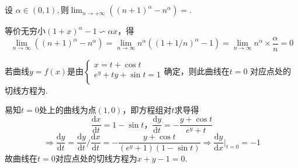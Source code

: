 \documentclass[hideanswer=false,
	enfont=newtxtext,
	zhfont=empty,
	mathfont=newtxmath,
]{cmcthesis}
\begin{document}

\addvspace{1\bigskipamount}

\\\\
\wq 设 $\alpha\in\left(0,1\right),\textrm{则} \lim_{n\rightarrow +\infty}\left(\left(n+1\right)^{\alpha}-n^{\alpha}\right)=$\underline{\hspace{3em}}.\\
	\begin{answer}
	\begin{solution}
等价无穷小$\left(1+x\right)^{\alpha}-1\backsim\alpha x$，得
		\[
		\lim_{n\rightarrow\infty}\left(\left(n+1\right)^{\alpha}-n^{\alpha}\right)=\lim_{n\rightarrow\infty}n^{\alpha}\left(\left(1+1/n\right)^{\alpha}-1\right)=\lim_{n\rightarrow\infty}n^{\alpha}\times\frac{\alpha}{n}=0
		\]
	\end{solution}
	\end{answer}
\wq $\textrm{若曲线}y=f\left(x\right)\textrm{是由}\left\{\begin{array}{l}
x=t+\cos t\\
e^y+ty+\sin t=1\\
\end{array}\right.\textrm{确定，则此曲线在}t=0$ 对应点处的\\
切线方程为\underline{\hspace{3em}}.\\
	\begin{answer}
	\begin{solution}
易知$t=0$处上的曲线为点$(1,0)$，即方程组对$t$求导得
\[
\frac{\mathrm{d}x}{\mathrm{d}t}=1-\sin t\textbf{，}\frac{\mathrm{d}y}{\mathrm{d}t}=-\frac{y+\cos t}{e^y+t}
\]
\[
\Rightarrow\frac{\mathrm{d}y}{\mathrm{d}t}=\frac{\mathrm{d}y}{\mathrm{d}t}/\frac{\mathrm{d}x}{\mathrm{d}t}=-\frac{y+\cos t}{\left(e^y+1\right)\left(1-\sin t\right)}\Rightarrow\frac{\mathrm{d}y}{\mathrm{d}x}|_{t=0}=-1
\]
故曲线在$t=0$对应点处的切线方程为$x+y-1=0$.
	\end{solution}
	\end{answer}
\end{document}
